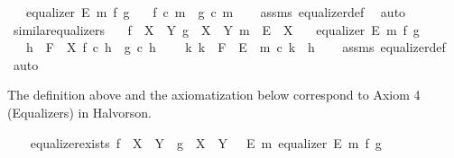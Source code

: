 \begin{isabellebody}
\ \ \ {\isachardoublequoteopen}equalizer\ E\ m\ f\ g{\isachardoublequoteclose}\isanewline
\ \ \ {\isachardoublequoteopen}f\ {\isasymcirc}\isactrlsub c\ m\ {\isacharequal}{\kern0pt}\ g\ {\isasymcirc}\isactrlsub c\ m{\isachardoublequoteclose}\isanewline
%
\isadelimproof
\ \ %
\endisadelimproof
%
\isatagproof
{}\isamarkupfalse%
\ assms\ equalizer{\isacharunderscore}{\kern0pt}def{}\ \isamarkupfalse%
\ auto%
\endisatagproof
{\isafoldproof}%
%
\isadelimproof
\isanewline
%
\endisadelimproof
\isanewline
{}\isamarkupfalse%
\ similar{\isacharunderscore}{\kern0pt}equalizers{\isacharcolon}{\kern0pt}\isanewline
\ \ \ {\isachardoublequoteopen}f\ {\isacharcolon}{\kern0pt}\ X\ {\isasymrightarrow}\ Y{\isachardoublequoteclose}\ {\isachardoublequoteopen}g\ {\isacharcolon}{\kern0pt}\ X\ {\isasymrightarrow}\ Y{\isachardoublequoteclose}\ {\isachardoublequoteopen}m\ {\isacharcolon}{\kern0pt}\ E\ {\isasymrightarrow}\ X{\isachardoublequoteclose}\isanewline
\ \ \ {\isachardoublequoteopen}equalizer\ E\ m\ f\ g{\isachardoublequoteclose}\isanewline
\ \ \ {\isachardoublequoteopen}h\ {\isacharcolon}{\kern0pt}\ F\ {\isasymrightarrow}\ X{\isachardoublequoteclose}\ {\isachardoublequoteopen}f\ {\isasymcirc}\isactrlsub c\ h\ {\isacharequal}{\kern0pt}\ g\ {\isasymcirc}\isactrlsub c\ h{\isachardoublequoteclose}\isanewline
\ \ \ {\isachardoublequoteopen}{\isasymexists}{\isacharbang}{\kern0pt}\ k{\isachardot}{\kern0pt}\ k\ {\isacharcolon}{\kern0pt}\ F\ {\isasymrightarrow}\ E\ {\isasymand}\ m\ {\isasymcirc}\isactrlsub c\ k\ {\isacharequal}{\kern0pt}\ h{\isachardoublequoteclose}\isanewline
%
\isadelimproof
\ \ %
\endisadelimproof
%
\isatagproof
{}\isamarkupfalse%
\ assms\ equalizer{\isacharunderscore}{\kern0pt}def{}\ \isamarkupfalse%
\ auto%
\endisatagproof
{\isafoldproof}%
%
\isadelimproof
%
\endisadelimproof
%
\begin{isamarkuptext}%
The definition above and the axiomatization below correspond to Axiom 4 (Equalizers) in Halvorson.%
\end{isamarkuptext}\isamarkuptrue%
\isamarkupfalse%
\ \isanewline
\ \ equalizer{\isacharunderscore}{\kern0pt}exists{\isacharcolon}{\kern0pt}\ {\isachardoublequoteopen}f\ {\isacharcolon}{\kern0pt}\ X\ {\isasymrightarrow}\ Y\ {\isasymLongrightarrow}\ g\ {\isacharcolon}{\kern0pt}\ X\ {\isasymrightarrow}\ Y\ {\isasymLongrightarrow}\ {\isasymexists}\ E\ m{\isachardot}{\kern0pt}\ equalizer\ E\ m\ f\ g{\isachardoublequoteclose}\isanewline

\end{isabellebody}
